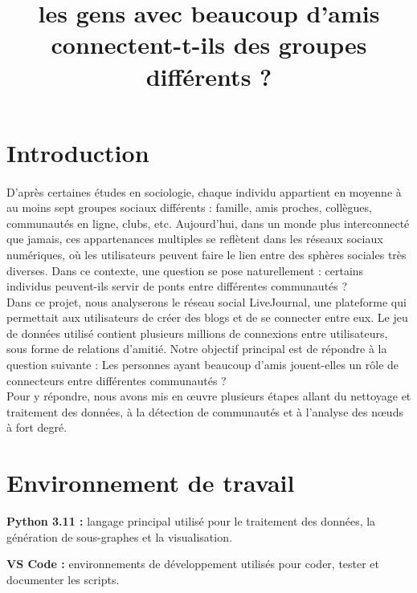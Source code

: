 \documentclass[a4paper, 12pt, twoside]{article}
\title{les gens avec beaucoup d’amis connectent-t-ils des groupes différents ?}
\begin{document}
\pagedegarde
\newpage

\tableofcontents
\newpage

\section{Introduction}

\paragraph{}D’après certaines études en sociologie, chaque individu appartient en moyenne à au moins sept groupes sociaux différents : famille, amis proches, collègues, communautés en ligne, clubs, etc. Aujourd’hui, dans un monde plus interconnecté que jamais, ces appartenances multiples se reflètent dans les réseaux sociaux numériques, où les utilisateurs peuvent faire le lien entre des sphères sociales très diverses. Dans ce contexte, une question se pose naturellement : certains individus peuvent-ils servir de ponts entre différentes communautés ? \\

Dans ce projet, nous analyserons le réseau social LiveJournal, une plateforme qui permettait aux utilisateurs de créer des blogs et de se connecter entre eux. Le jeu de données utilisé contient plusieurs millions de connexions entre utilisateurs, sous forme de relations d’amitié.
Notre objectif principal est de répondre à la question suivante :
Les personnes ayant beaucoup d'amis jouent-elles un rôle de connecteurs entre différentes communautés ?\\

Pour y répondre, nous avons mis en œuvre plusieurs étapes allant du nettoyage et traitement des données, à la détection de communautés et à l’analyse des nœuds à fort degré. 





\section{Environnement de travail}
\textbf{Python 3.11 :} langage principal utilisé pour le traitement des données, la génération de sous-graphes et la visualisation.

\textbf{ VS Code :} environnements de développement utilisés pour coder, tester et documenter les scripts.
\end{document}
